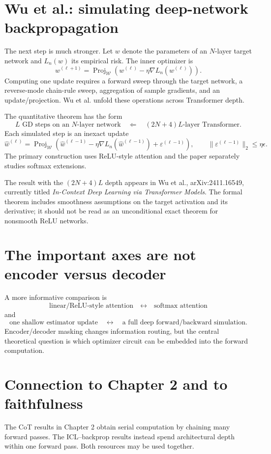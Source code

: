 \documentclass[11pt,a4paper,oneside,openany]{memoir}
\theoremstyle{definition}
\begin{document}
\section{Wu et al.: simulating deep-network backpropagation}
The next step is much stronger.  Let $w$ denote the parameters of an $N$-layer target network and $L_n(w)$ its empirical risk.  The inner optimizer is
\[
w^{(\ell+1)}
=\operatorname{Proj}_{\mathcal W}
\left(w^{(\ell)}-\eta\nabla L_n(w^{(\ell)})\right).
\]
Computing one update requires a forward sweep through the target network, a reverse-mode chain-rule sweep, aggregation of sample gradients, and an update/projection.  Wu et al. unfold these operations across Transformer depth.

The quantitative theorem has the form
\[
\boxed{
\text{$L$ GD steps on an $N$-layer network}
\quad\Longleftarrow\quad
(2N+4)L\text{-layer Transformer}.}
\]
Each simulated step is an inexact update
\[
\widehat w^{(\ell)}
=\operatorname{Proj}_{\mathcal W}
\left(
\widehat w^{(\ell-1)}-
\eta\nabla L_n(\widehat w^{(\ell-1)})
+\varepsilon^{(\ell-1)}
\right),
\qquad
\|\varepsilon^{(\ell-1)}\|_2\le\eta\epsilon.
\]
The primary construction uses ReLU-style attention and the paper separately studies softmax extensions.

\begin{warningbox}
The result with the $(2N+4)L$ depth appears in Wu et al., arXiv:2411.16549, currently titled \emph{In-Context Deep Learning via Transformer Models}.  The formal theorem includes smoothness assumptions on the target activation and its derivative; it should not be read as an unconditional exact theorem for nonsmooth ReLU networks.
\end{warningbox}

\section{The important axes are not encoder versus decoder}
A more informative comparison is
\[
\text{linear/ReLU-style attention}
\quad\leftrightarrow\quad
\text{softmax attention}
\]
and
\[
\text{one shallow estimator update}
\quad\leftrightarrow\quad
\text{a full deep forward/backward simulation}.
\]
Encoder/decoder masking changes information routing, but the central theoretical question is which optimizer circuit can be embedded into the forward computation.

\section{Connection to Chapter 2 and to faithfulness}
The CoT results in Chapter 2 obtain serial computation by chaining many forward passes.  The ICL--backprop results instead spend architectural depth within one forward pass.  Both resources may be used together.
\end{document}
